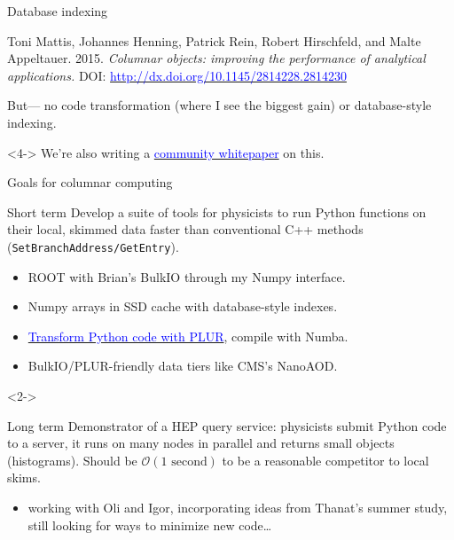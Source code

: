 \documentclass{beamer}
\begin{document}
\begin{frame}{Database indexing}
\begin{uncoverenv}
\begin{minipage}{\linewidth}
\scriptsize
Toni Mattis, Johannes Henning, Patrick Rein, Robert Hirschfeld, and Malte Appeltauer. 2015. {\it Columnar objects: improving the performance of analytical applications.} DOI: \href{http://dx.doi.org/10.1145/2814228.2814230}{\textcolor{blue}{http://dx.doi.org/10.1145/2814228.2814230}}
\end{minipage}

\vspace{0.1 cm}
But--- no code transformation (where I see the biggest gain) or database-style indexing.
\end{uncoverenv}

\vspace{0.35 cm}
\begin{uncoverenv}<4->
We're also writing a \href{https://docs.google.com/document/d/1-ZrnsS3IZdH91_pb99OLGd4gxaMm3m3Vr7XBigpx8DE/edit?usp=sharing}{\textcolor{blue}{community whitepaper}} on this.
\end{uncoverenv}
\end{frame}

\begin{frame}{Goals for columnar computing}
\vspace{0.2 cm}
\begin{block}{Short term}
Develop a suite of tools for physicists to run Python functions on their local, skimmed data faster than conventional C++ methods ({\tt\small SetBranchAddress/GetEntry}).
\begin{itemize}
\item ROOT with Brian's BulkIO through my Numpy interface.
\item Numpy arrays in SSD cache with database-style indexes.
\item \href{https://github.com/diana-hep/plur}{\textcolor{blue}{Transform Python code with PLUR}}, compile with Numba.
\item BulkIO/PLUR-friendly data tiers like CMS's NanoAOD.
\end{itemize}
\end{block}

\vspace{-0.2 cm}
\begin{uncoverenv}<2->
\begin{block}{Long term}
Demonstrator of a HEP query service: physicists submit Python code to a server, it runs on many nodes in parallel and returns small objects (histograms). Should be $\mathcal{O}({\mbox{1 second}})$ to be a reasonable competitor to local skims.
\begin{itemize}
\item working with Oli and Igor, incorporating ideas from Thanat's summer study, still looking for ways to minimize new code\ldots
\end{itemize}
\end{block}
\end{uncoverenv}
\end{frame}
\end{document}
